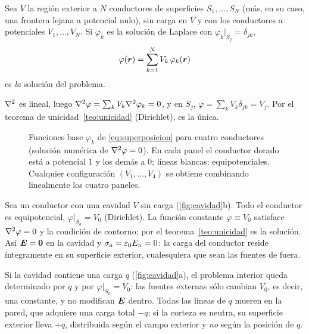\documentclass[11pt,a4paper,twoside]{article}
\begin{document}
\begin{corolario}\label{cor:superposicion}
Sea $V$ la región exterior a $N$ conductores de superficies $S_1,\dots,S_N$ (más, en su caso,
una frontera lejana a potencial nulo), sin carga en $V$ y con los conductores a potenciales
$V_1,\dots,V_N$. Si $\varphi_k$ es la solución de Laplace con $\varphi_k|_{S_j}=\delta_{jk}$,
\begin{equation}\label{eq:superposicion}
  \varphi(\bm{r})=\sum_{k=1}^{N}V_k\,\varphi_k(\bm{r})
\end{equation}
es \emph{la} solución del problema.
\end{corolario}

\begin{demostracion}
$\nabla^{2}$ es lineal, luego $\nabla^{2}\varphi=\sum_kV_k\nabla^{2}\varphi_k=0$, y en $S_j$,
$\varphi=\sum_kV_k\delta_{jk}=V_j$. Por el teorema de unicidad~\ref{teo:unicidad} (Dirichlet), es la única.
\end{demostracion}

\begin{figure}[!htb]
  \centering
  
  \caption{Funciones base $\varphi_k$ de \eqref{eq:superposicion} para cuatro conductores
  (solución numérica de $\nabla^{2}\varphi=0$). En cada panel el conductor dorado está a
  potencial $1$ y los demás a $0$; líneas blancas: equipotenciales. Cualquier
  configuración $(V_1,\dots,V_4)$ se obtiene combinando linealmente los cuatro paneles.}
  \label{fig:superposicion}
\end{figure}

\begin{ejemplo}\label{ej:cavidad}
Sea un conductor con una cavidad $V$ sin carga (\cref{fig:cavidad}b). Todo el conductor es
equipotencial, $\varphi|_{S_a}=V_0$ (Dirichlet). La función constante $\varphi\equiv V_0$
satisface $\nabla^{2}\varphi=0$ y la condición de contorno; por el teorema~\ref{teo:unicidad} es la
solución. Así $\bm{E}=\bm0$ en la cavidad y $\sigma_a=\varepsilon_{0} E_n=0$: la carga del conductor
reside íntegramente en su superficie exterior, cualesquiera que sean las fuentes de fuera.
\end{ejemplo}

\begin{ejemplo}\label{ej:apantallamiento}
Si la cavidad contiene una carga $q$ (\cref{fig:cavidad}a), el problema interior queda
determinado por $q$ y por $\varphi|_{S_a}=V_0$: las fuentes externas sólo cambian $V_0$, es
decir, una constante, y no modifican $\bm{E}$ dentro. Todas las líneas de $q$ mueren en la
pared, que adquiere una carga total $-q$; si la corteza es neutra, su superficie exterior
lleva $+q$, distribuida según el campo exterior y \emph{no} según la posición de $q$.
\end{ejemplo}
\end{document}
